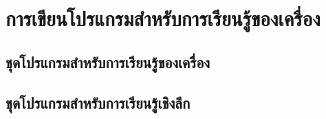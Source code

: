 

\chapter{การเขียนโปรแกรมสำหรับการเรียนรู้ของเครื่อง}
\label{ap:programming}

\section{ชุดโปรแกรมสำหรับการเรียนรู้ของเครื่อง}

\section{ชุดโปรแกรมสำหรับการเรียนรู้เชิงลึก}
